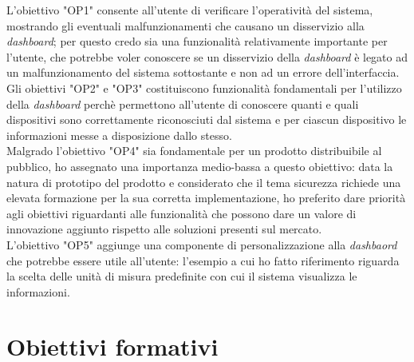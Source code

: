 L'obiettivo "OP1" consente all'utente di verificare l'operatività del sistema, mostrando gli eventuali malfunzionamenti che causano un disservizio alla \emph{dashboard}; per questo credo sia una funzionalità relativamente importante per l'utente, che potrebbe voler conoscere se un disservizio della \emph{dashboard} è legato ad un malfunzionamento del sistema sottostante e non ad un errore dell'interfaccia. \\

Gli obiettivi "OP2" e "OP3" costituiscono funzionalità fondamentali per l'utilizzo della \emph{dashboard} perchè permettono all'utente di conoscere quanti e quali dispositivi sono correttamente riconosciuti dal sistema e per ciascun dispositivo le informazioni messe a disposizione dallo stesso. \\

Malgrado l'obiettivo "OP4" sia fondamentale per un prodotto distribuibile al pubblico, ho assegnato una importanza medio-bassa a questo obiettivo: data la natura di prototipo del prodotto e considerato che il tema sicurezza richiede una elevata formazione per la sua corretta implementazione, ho preferito dare priorità agli obiettivi riguardanti alle funzionalità che possono dare un valore di innovazione aggiunto rispetto alle soluzioni presenti sul mercato. \\

L'obiettivo "OP5" aggiunge una componente di personalizzazione alla \emph{dashbaord} che potrebbe essere utile all'utente: l'esempio a cui ho fatto riferimento riguarda la scelta delle unità di misura predefinite con cui il sistema visualizza le informazioni. \\

\section{Obiettivi formativi}

